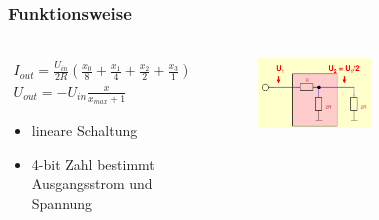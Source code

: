 \begin{frame}
    \frametitle{Funktionsweise}
    \framesubtitle{}
    \begin{columns}[c]
            \begin{block}{}
                \begin{gather*}
                    I_{out} = \frac{U_{in}}{2R}\left( \frac{x_0}{8} +
                    \frac{x_1}{4} + \frac{x_2}{2} + \frac{x_3}{1} \right) \\
                    U_{out} = - U_{in} \frac{x}{x_{max} +1}
                \end{gather*}
                \begin{itemize}
                    \item lineare Schaltung 
                    \item 4-bit Zahl bestimmt Ausgangsstrom und Spannung
                \end{itemize}
            \end{block}
            \begin{figure}[H]
                 \begin{center}
                         \includegraphics[scale=0.2]{./img/schaltung/r2r_1.png}
                 \end{center}
            \end{figure}
            \begin{figure}[H]
                 \begin{center}

\end{center}
\end{figure}
\end{columns}
\end{frame}

